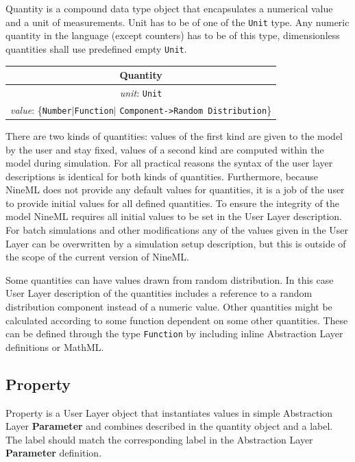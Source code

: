 \documentclass{article}
\newcommand{\Parameter}{{\bf{Parameter}}\xspace}
\begin{document}
Quantity is a compound data type object that encapsulates a numerical value
and a unit of measurements. Unit has to be of one of the {\tt Unit} type.
Any numeric quantity in the language (except counters) has to be of this type,
dimensionless quantities shall use predefined empty {\tt Unit}.

\begin{table}[htb]
\center
\begin{tabular}{|c|}
\hline
\hline
Quantity \\
\hline
\hline
{\em unit}: {\tt Unit} \\
\hline
{\em value}: \{{\tt Number}$|${\tt Function}$|$%
{\tt Component->Random Distribution}\} \\
\hline
\end{tabular}
\end{table}

There are two kinds of quantities: values of the first kind are given to the
model by the user and stay fixed, values of a second kind are computed within
the model during simulation. For all practical reasons the syntax of the user
layer descriptions is identical for both kinds of quantities. Furthermore,
because NineML does not provide any default values for quantities, it is a
job of the user to provide initial values for all defined quantities. To
ensure the integrity of the model NineML requires all initial values to be
set in the User Layer description. For batch simulations and other
modifications any of the values given in the User Layer can be overwritten
by a simulation setup description, but this is outside of the scope of the
current version of NineML.

Some quantities can have values drawn from random distribution. In
this case User Layer description of the quantities includes a
reference to a random distribution component instead of a numeric
value.  Other quantities might be calculated according to some
function dependent on some other quantities. These can be defined
through the type {\tt Function} by including inline Abstraction Layer
definitions or MathML.

\subsection{Property}

Property is a User Layer object that instantiates values in simple
Abstraction Layer \Parameter and combines described in the quantity object
and a label. The label should match the corresponding label in the
Abstraction Layer \Parameter definition.
\end{document}

